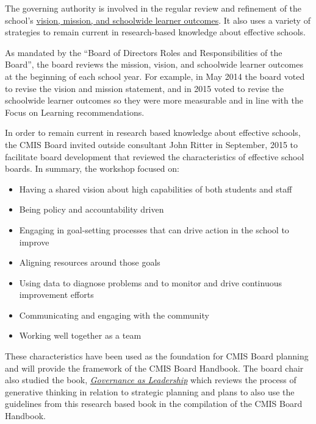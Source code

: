 \begin{findings}

The governing authority is involved in the regular review and refinement of the school’s \href{http://cmis.ac.th/about/vision}{vision, mission, and schoolwide learner outcomes}. It also uses a variety of strategies to remain current in research-based knowledge about effective schools.

As mandated by the ``Board of Directors Roles and Responsibilities of the Board'', the board reviews the mission, vision, and schoolwide learner outcomes at the beginning of each school year. For example, in May 2014 the board voted to revise the vision and mission statement, and in 2015 voted to revise the schoolwide learner outcomes so they were more measurable and in line with the Focus on Learning recommendations. 

In order to remain current in research based knowledge about effective schools, the CMIS Board invited outside consultant John Ritter in September, 2015 to facilitate board development  that reviewed the characteristics of effective school boards. In summary, the workshop focused on:

\begin{itemize}
\item Having a shared vision about high capabilities of both students and staff
\item Being policy and accountability driven
\item Engaging in goal-setting processes that can drive action in the school to improve
\item Aligning resources around those goals
\item Using data to diagnose problems and to monitor and drive continuous improvement efforts
\item Communicating and engaging with the community
\item Working well together as a team 
\end{itemize}

These characteristics have been used as the foundation for CMIS Board planning and will provide the framework of the CMIS Board Handbook. The board chair also studied the book, \href{https://www.amazon.com/Governance-Leadership-Reframing-Nonprofit-boards/dp/0471684201}{\textit{Governance as Leadership}}  which reviews the process of generative thinking in relation to strategic planning and plans to also use the guidelines from this research based book in the compilation of the CMIS Board Handbook.


\end{findings}
